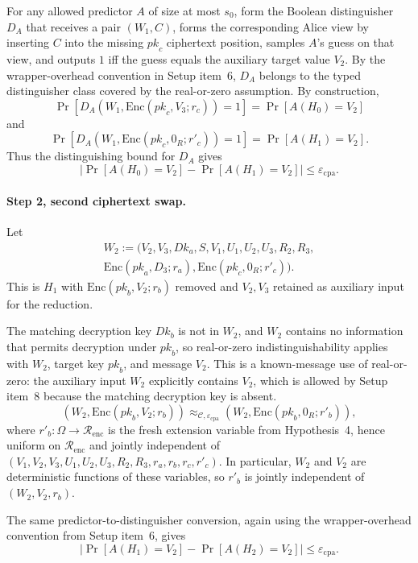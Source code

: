 \documentclass[11pt]{article}
\newcommand{\Renc}{\mathcal{R}_{\mathrm{enc}}}
\newcommand{\epscpa}{\varepsilon_{\mathrm{cpa}}}
\newcommand{\C}{\mathcal{C}}
\newcommand{\Encf}{\mathrm{Enc}}
\newcommand{\Dk}{\mathit{Dk}}
\newcommand{\pk}{\mathit{pk}}
\begin{document}
For any allowed predictor $A$ of size at most $s_0$, form the Boolean distinguisher $D_A$ that receives a pair $(W_1,C)$, forms the corresponding Alice view by inserting $C$ into the missing $\pk_c$ ciphertext position, samples $A$'s guess on that view, and outputs $1$ iff the guess equals the auxiliary target value $V_2$. By the wrapper-overhead convention in Setup item~6, $D_A$ belongs to the typed distinguisher class covered by the real-or-zero assumption. By construction,
\[
\Pr[D_A(W_1,\Encf(\pk_c,V_3;r_c))=1] = \Pr[A(H_0)=V_2]
\]
and
\[
\Pr[D_A(W_1,\Encf(\pk_c,0_R;r'_c))=1] = \Pr[A(H_1)=V_2].
\]
Thus the distinguishing bound for $D_A$ gives
\[
\left|\Pr[A(H_0)=V_2] - \Pr[A(H_1)=V_2]\right| \leq \epscpa.
\]

\paragraph{Step 2, second ciphertext swap.} Let
\begin{multline*}
W_2 := \big( V_2, V_3, \Dk_a, S, V_1, U_1, U_2, U_3, R_2, R_3, \\
\Encf(\pk_a, D_3; r_a), \Encf(\pk_c, 0_R; r'_c) \big).
\end{multline*}
This is $H_1$ with $\Encf(\pk_b, V_2; r_b)$ removed and $V_2, V_3$ retained as auxiliary input for the reduction.

The matching decryption key $\Dk_b$ is not in $W_2$, and $W_2$ contains no information that permits decryption under $\pk_b$, so real-or-zero indistinguishability applies with $W_2$, target key $\pk_b$, and message $V_2$. This is a known-message use of real-or-zero: the auxiliary input $W_2$ explicitly contains $V_2$, which is allowed by Setup item~8 because the matching decryption key is absent.
\[
(W_2, \Encf(\pk_b, V_2; r_b)) \approx_{\C, \epscpa} (W_2, \Encf(\pk_b, 0_R; r'_b)),
\]
where $r'_b : \Omega \to \Renc$ is the fresh extension variable from Hypothesis~4, hence uniform on $\Renc$ and jointly independent of $(V_1,V_2,V_3,U_1,U_2,U_3,R_2,R_3,r_a,r_b,r_c,r'_c)$. In particular, $W_2$ and $V_2$ are deterministic functions of these variables, so $r'_b$ is jointly independent of $(W_2, V_2, r_b)$.

The same predictor-to-distinguisher conversion, again using the wrapper-overhead convention from Setup item~6, gives
\[
\left|\Pr[A(H_1)=V_2] - \Pr[A(H_2)=V_2]\right| \leq \epscpa.
\]
\end{document}
